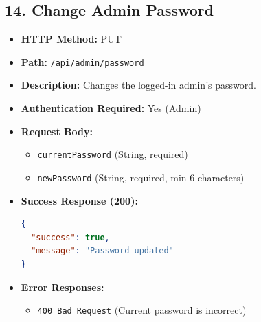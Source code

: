 \documentclass[12pt,a4paper]{article}
\begin{document}
\subsection{14. Change Admin Password}
\begin{itemize}
    \item \textbf{HTTP Method:} PUT
    \item \textbf{Path:} \texttt{/api/admin/password}
    \item \textbf{Description:} Changes the logged-in admin's password.
    \item \textbf{Authentication Required:} Yes (Admin)
    \item \textbf{Request Body:}
    \begin{itemize}
        \item \texttt{currentPassword} (String, required)
        \item \texttt{newPassword} (String, required, min 6 characters)
    \end{itemize}
    \item \textbf{Success Response (200):}
\begin{lstlisting}[language=json]
{
  "success": true,
  "message": "Password updated"
}
\end{lstlisting}
    \item \textbf{Error Responses:}
    \begin{itemize}
        \item \texttt{400 Bad Request} (Current password is incorrect)
    \end{itemize}
\end{itemize}
\end{document}
